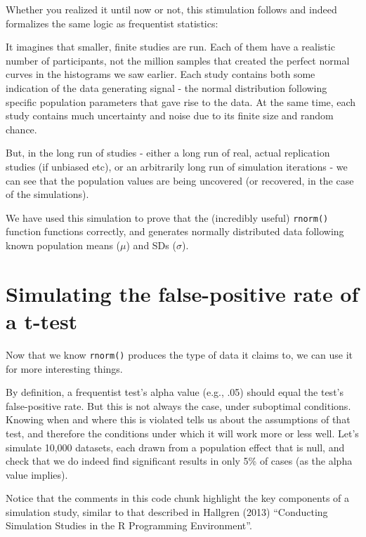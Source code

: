 \documentclass[
]{article}
\begin{document}
Whether you realized it until now or not, this stimulation follows and
indeed formalizes the same logic as frequentist statistics:

It imagines that smaller, finite studies are run. Each of them have a
realistic number of participants, not the million samples that created
the perfect normal curves in the histograms we saw earlier. Each study
contains both some indication of the data generating signal - the normal
distribution following specific population parameters that gave rise to
the data. At the same time, each study contains much uncertainty and
noise due to its finite size and random chance.

But, in the long run of studies - either a long run of real, actual
replication studies (if unbiased etc), or an arbitrarily long run of
simulation iterations - we can see that the population values are being
uncovered (or recovered, in the case of the simulations).

We have used this simulation to prove that the (incredibly useful)
\texttt{rnorm()} function functions correctly, and generates normally
distributed data following known population means (\(\mu\)) and SDs
(\(\sigma\)).

\hypertarget{simulating-the-false-positive-rate-of-a-t-test}{%
\section{Simulating the false-positive rate of a
t-test}\label{simulating-the-false-positive-rate-of-a-t-test}}

Now that we know \texttt{rnorm()} produces the type of data it claims
to, we can use it for more interesting things.

By definition, a frequentist test's alpha value (e.g., .05) should equal
the test's false-positive rate. But this is not always the case, under
suboptimal conditions. Knowing when and where this is violated tells us
about the assumptions of that test, and therefore the conditions under
which it will work more or less well. Let's simulate 10,000 datasets,
each drawn from a population effect that is null, and check that we do
indeed find significant results in only 5\% of cases (as the alpha value
implies).

Notice that the comments in this code chunk highlight the key components
of a simulation study, similar to that described in Hallgren (2013)
``Conducting Simulation Studies in the R Programming Environment''.
\end{document}
